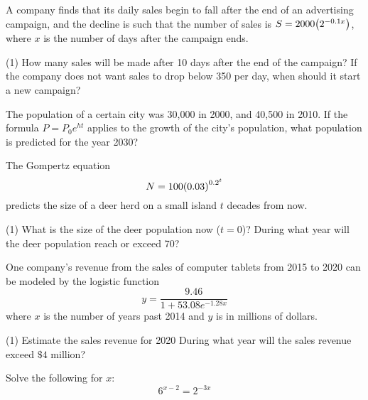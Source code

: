 \documentclass[../mathNotesPreamble]{subfiles}
\begin{document}
    \begin{ex*}
      A company finds that its daily sales begin to fall after the end of an advertising campaign, and the decline is such that the number of sales is $S=2000{\left(2^{-0.1x}\right)}$, where $x$ is the number of days after the campaign ends.
    \end{ex*}
    \begin{extasks}[after-item-skip=\stretch{0.5}](1)
      \task How many sales will be made after 10 days after the end of the campaign?
      \task If the company does not want sales to drop below 350 per day, when should it start a new campaign?
    \end{extasks}
    \pagebreak

    \begin{ex*}
      The population of a certain city was 30,000 in 2000, and 40,500 in 2010. If the formula $P=P_0e^{ht}$ applies to the growth of the city's population, what population is predicted for the year 2030?
    \end{ex*}
    \pagebreak

    \begin{ex*}
      The Gompertz equation
        \[N=100{\left(0.03\right)}^{0.2^t}\]
      predicts the size of a deer herd on a small island $t$ decades from now.
    \end{ex*}
    \begin{extasks}[after-item-skip=4\baselineskip](1)
      \task What is the size of the deer population now ($t=0$)?
      \task During what year will the deer population reach or exceed 70?
    \end{extasks}
    \pagebreak

    \begin{ex*}
      One company's revenue from the sales of computer tablets from 2015 to 2020 can be modeled by the logistic function
        \[y=\frac{9.46}{1+53.08e^{-1.28x}}\]
      where $x$ is the number of years past 2014 and $y$ is in millions of dollars.
    \end{ex*}
    \begin{extasks}[after-item-skip=\stretch{0.25}](1)
      \task Estimate the sales revenue for 2020
      \task During what year will the sales revenue exceed $\$4$ million?
    \end{extasks}
    \pagebreak

    \begin{ex*}[Bonus]
      Solve the following for $x$:
        \[6^{x-2}=2^{-3x}\]
    \end{ex*}

  \pagebreak
\end{document}
